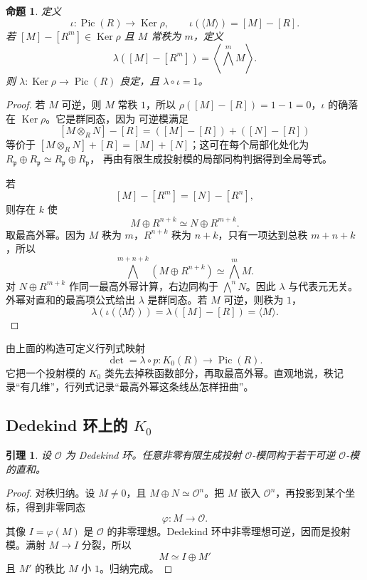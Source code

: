 \documentclass[11pt,a4paper,openany]{ctexbook}
\numberwithin{equation}{chapter}
\newcommand{\Pic}{\operatorname{Pic}}
\newcommand{\Ker}{\operatorname{Ker}}
\theoremstyle{plain}
\newtheorem{proposition}[theorem]{命题}
\newtheorem{lemma}[theorem]{引理}
\theoremstyle{definition}
\theoremstyle{remark}
\begin{document}
\begin{proposition}
定义
\[
\iota:\Pic(R)\to\Ker\rho,\qquad
\iota(\langle M\rangle)=[M]-[R].
\]
若 $[M]-[R^m]\in\Ker\rho$ 且 $M$ 常秩为 $m$，定义
\[
\lambda([M]-[R^m])=\left\langle\bigwedge^m M\right\rangle.
\]
则 $\lambda:\Ker\rho\to\Pic(R)$ 良定，且 $\lambda\circ\iota=1$。
\end{proposition}

\begin{proof}
若 $M$ 可逆，则 $M$ 常秩 $1$，所以
$\rho([M]-[R])=1-1=0$，$\iota$ 的确落在 $\Ker\rho$。它是群同态，因为
可逆模满足
\[
[M\otimes_RN]-[R]=([M]-[R])+([N]-[R])
\]
等价于 $[M\otimes_RN]+[R]=[M]+[N]$；这可在每个局部化处化为
$R_{\mathfrak p}\oplus R_{\mathfrak p}\simeq R_{\mathfrak p}\oplus R_{\mathfrak p}$，
再由有限生成投射模的局部同构判据得到全局等式。

若
\[
[M]-[R^m]=[N]-[R^n],
\]
则存在 $k$ 使
\[
M\oplus R^{n+k}\simeq N\oplus R^{m+k}.
\]
取最高外幂。因为 $M$ 秩为 $m$，$R^{n+k}$ 秩为 $n+k$，只有一项达到总秩 $m+n+k$，所以
\[
\bigwedge^{m+n+k}(M\oplus R^{n+k})
\simeq
\bigwedge^mM.
\]
对 $N\oplus R^{m+k}$ 作同一最高外幂计算，右边同构于 $\bigwedge^nN$。因此 $\lambda$ 与代表元无关。外幂对直和的最高项公式给出 $\lambda$ 是群同态。若 $M$ 可逆，则秩为 $1$，
\[
\lambda(\iota(\langle M\rangle))
\allowbreak
=\lambda([M]-[R])
=\langle M\rangle.
\]
\end{proof}

由上面的构造可定义行列式映射
\[
\det=\lambda\circ p:K_0(R)\longrightarrow\Pic(R).
\]
它把一个投射模的 $K_0$ 类先去掉秩函数部分，再取最高外幂。直观地说，秩记录“有几维”，行列式记录“最高外幂这条线丛怎样扭曲”。

\subsection{Dedekind 环上的 \texorpdfstring{$K_0$}{K0}}

\begin{lemma}
设 $\mathcal O$ 为 Dedekind 环。任意非零有限生成投射 $\mathcal O$-模同构于若干可逆 $\mathcal O$-模的直和。
\end{lemma}

\begin{proof}
对秩归纳。设 $M\ne0$，且 $M\oplus N\simeq\mathcal O^n$。把 $M$ 嵌入 $\mathcal O^n$，再投影到某个坐标，得到非零同态
\[
\varphi:M\to\mathcal O.
\]
其像 $I=\varphi(M)$ 是 $\mathcal O$ 的非零理想。Dedekind 环中非零理想可逆，因而是投射模。满射 $M\to I$ 分裂，所以
\[
M\simeq I\oplus M'
\]
且 $M'$ 的秩比 $M$ 小 $1$。归纳完成。
\end{proof}
\end{document}
